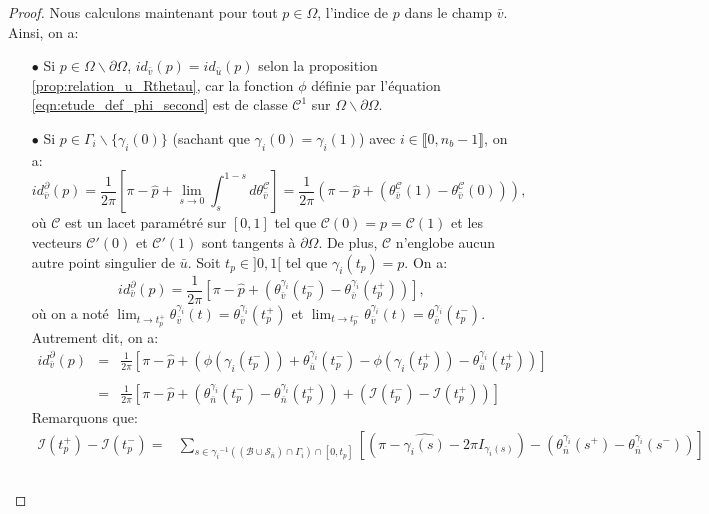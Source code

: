 \begin{proof}
    Nous calculons maintenant pour tout $p\in\Omega$, l'indice de $p$ dans le champ $\bar{v}$. Ainsi, on a:\\
    \begin{itemize}
        \item[$\bullet$] Si $p\in\Omega\backslash\partial\Omega$, $id_{\bar{v}}(p)=id_{\bar{u}}(p)$ selon la proposition \ref{prop:relation_u_Rthetau}, car la fonction $\phi$ définie par l'équation \eqref{eqn:etude_def_phi_second} est de classe $\mathcal{C}^1$ sur $\Omega\backslash\partial\Omega$.\\
        \item[$\bullet$] Si $p\in\Gamma_i\backslash\{\gamma_i(0)\}$ (sachant que $\gamma_i(0)=\gamma_i(1)$) avec $i\in\llbracket0, n_b-1\rrbracket$, on a:
        $$
        id^\partial_{\bar{v}}(p)=\frac{1}{2\pi}\left[\pi-\widehat{p}+\displaystyle\lim\limits_{s\rightarrow 0}\int_s^{1-s}d\theta_{\bar{v}}^{\mathcal{C}}\right]=\frac{1}{2\pi}\left(\pi-\widehat{p}+(\theta_{\bar{v}}^{\mathcal{C}}(1)-\theta_{\bar{v}}^{\mathcal{C}}(0))\right),
        $$
        où $\mathcal{C}$ est un lacet paramétré sur $[0, 1]$ tel que $\mathcal{C}(0)=p=\mathcal{C}(1)$ et les vecteurs $\mathcal{C}'(0)$ et $\mathcal{C}'(1)$ sont tangents à $\partial\Omega$. De plus, $\mathcal{C}$ n'englobe aucun autre point singulier de $\bar{u}$. Soit $t_p\in]0, 1[$ tel que $\gamma_i(t_p)=p$. On a:
        $$
        id^\partial_{\bar{v}}(p)=\frac{1}{2\pi}\left[\pi-\widehat{p}+\left(\theta_{\bar{v}}^{\gamma_i}(t_p^-)-\theta_{\bar{v}}^{\gamma_i}(t_p^+)\right)\right],
        $$
        où on a noté $\lim_{t\rightarrow t_p^+}\theta^{\gamma_i}_{\bar{v}}(t)=\theta^{\gamma_i}_{\bar{v}}(t_p^+)$ et $\lim_{t\rightarrow t_p^-}\theta^{\gamma_i}_{\bar{v}}(t)=\theta_{\bar{v}}^{\gamma_i}(t_p^-)$. Autrement dit, on a:
        $$
        \begin{array}{lcl}
        id^\partial_{\bar{v}}(p)&=&\displaystyle\frac{1}{2\pi}\left[\pi-\widehat{p}+\left(\phi(\gamma_i(t_p^-))+\theta_{\bar{u}}^{\gamma_i}(t_p^-)-\phi(\gamma_i(t_p^+))-\theta_{\bar{u}}^{\gamma_i}(t_p^+)\right)\right]\\\\
        &=&\displaystyle\frac{1}{2\pi}\left[\pi-\widehat{p}+\left(\theta_{\bar{n}}^{\gamma_i}(t_p^-)-\theta_{\bar{n}}^{\gamma_i}(t_p^+)\right)+\left(\mathcal{I}(t_p^-)-\mathcal{I}(t_p^+)\right)\right]
        \end{array}
        $$
        Remarquons que:
        $$
        \begin{array}{ll}
            \mathcal{I}(t_p^+)-\mathcal{I}(t_p^-)=&\displaystyle\sum_{s\in{\gamma_i}^{-1}((\mathcal{B}\cup\mathcal{S}_{\bar{n}})\cap\Gamma_i)\cap[0, t_p]}\left[\left(\pi-\widehat{\gamma_i(s)}-2\pi I_{\gamma_i(s)}\right)-\left(\theta^{\gamma_i}_{\bar{n}}(s^+) - \theta^{\gamma_i}_{\bar{n}}(s^-)\right)\right]\\\\

\end{array}$$
\end{itemize}
\end{proof}
